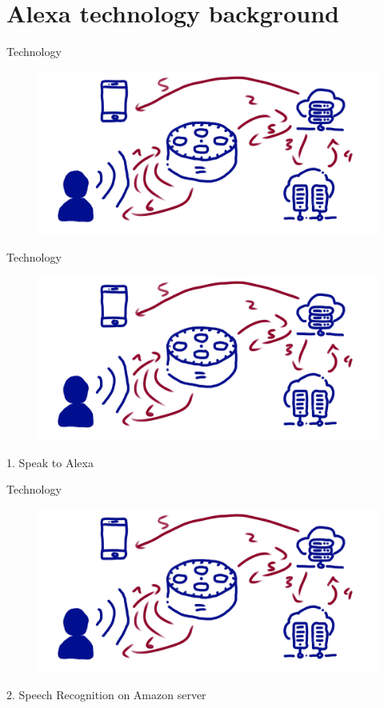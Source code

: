 \documentclass[aspectratio=169]{beamer}
\begin{document}
\section{Alexa technology background}
\begin{frame}{Technology}
	\begin{figure}
		\includegraphics[width=1\linewidth]{images/alexatech}
	\end{figure}
\end{frame}

\begin{frame}{Technology}
\begin{figure}
	\includegraphics[width=0.9\linewidth]{images/alexatech}
\end{figure}
1. Speak to Alexa
\end{frame}

\begin{frame}{Technology}
\begin{figure}
	\includegraphics[width=0.9\linewidth]{images/alexatech}
\end{figure}
2. Speech Recognition on Amazon server
\end{frame}
\end{document}
